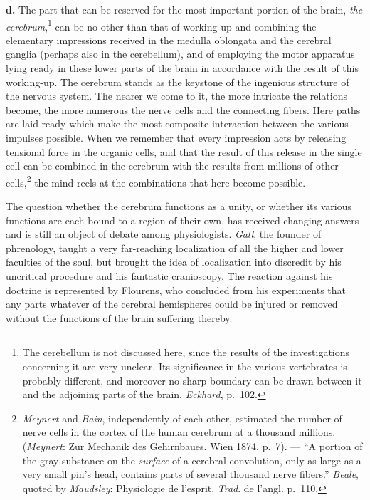 \documentclass[12pt,a4paper]{book}
\newcommand{\opage}[1]{\marginnote{\footnotesize\textit{[#1]}}}
\begin{document}
\textbf{d.} The part that can be reserved for the most important portion
of the brain,
\emph{the cerebrum},\footnote{The cerebellum is not discussed here,
since the results of the investigations concerning it are very unclear.
Its significance in the various vertebrates is probably different, and
moreover no sharp boundary can be drawn between it and the adjoining
parts of the brain. \emph{Eckhard}, p.~102.} can be no other than that
of working up and combining the elementary impressions received in the
medulla oblongata and the cerebral ganglia (perhaps also in the
cerebellum), and of employing the motor apparatus lying ready in these
lower parts of the brain in accordance with the result of this
working-up. The cerebrum stands as the keystone of the ingenious
structure of the nervous system. The nearer we come to it, the more
intricate the relations become, the more numerous the nerve cells and
the connecting fibers. Here paths are laid ready which make the most
composite interaction between the various impulses
\opage{49}possible. When we remember that every impression acts by
releasing tensional force in the organic cells, and that the result of
this release in the single cell can be combined in the cerebrum with the
results from millions of other cells,\footnote{\emph{Meynert} and
\emph{Bain}, independently of each other, estimated the number of nerve
cells in the cortex of the human cerebrum at a thousand millions.
(\emph{Meynert}: Zur Mechanik des Gehirnbaues. Wien 1874. p.~7). ---
``A portion of the gray substance on the \emph{surface} of a cerebral
convolution, only as large as a very small pin's head, contains parts
of several thousand nerve fibers.'' \emph{Beale}, quoted by
\emph{Maudsley}: Physiologie de l'esprit. \emph{Trad}. de l'angl.
p.~110.} the mind reels at the combinations that here become possible.

The question whether the cerebrum functions as a unity, or whether its
various functions are each bound to a region of their own, has received
changing answers and is still an object of debate among physiologists.
\emph{Gall}, the founder of phrenology, taught a very far-reaching
localization of all the higher and lower faculties of the soul, but
brought the idea of localization into discredit by his uncritical
procedure and his fantastic cranioscopy. The reaction against his
doctrine is represented by Flourens, who concluded from his experiments
that any parts whatever of the cerebral hemispheres could be injured or
removed without the functions of the brain suffering thereby.
\end{document}
